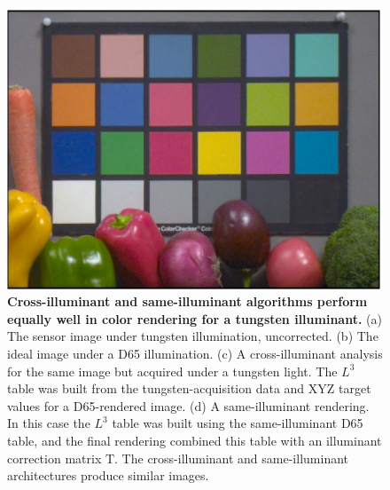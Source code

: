 \documentclass[]{spie}
\newcommand{\Lcube}{L^3}
\newcommand{\SIDT}{\mathrm{SI_{D65}-T}}
\newcommand{\TT}{\mathrm{T}}
\begin{document}
\begin{figure}[t]
\begin{center}
\begin{minipage}[b]{0.245\textwidth}
 \includegraphics[width=\textwidth]{Fig3/srgbR_Vegetables_RGBW1_Tungsten1_opt3}
 \centering\small\text{(d) $\SIDT$}
\end{minipage}
\end{center}
\caption{\textbf{Cross-illuminant and same-illuminant algorithms perform equally well in color rendering for a tungsten illuminant.} (a) The sensor image under tungsten illumination, uncorrected. (b) The ideal image under a D65 illumination. (c) A cross-illuminant analysis for the same image but acquired under a tungsten light. The $\Lcube$ table was built from the tungsten-acquisition data and XYZ target values for a D65-rendered image. (d) A same-illuminant rendering. In this case the $\Lcube$ table was built using the same-illuminant D65 table, and the final rendering combined this table with an illuminant correction matrix $\TT$. The cross-illuminant and same-illuminant architectures produce similar images.}
\label{fig:examplestungsten}
\end{figure}
\end{document}
